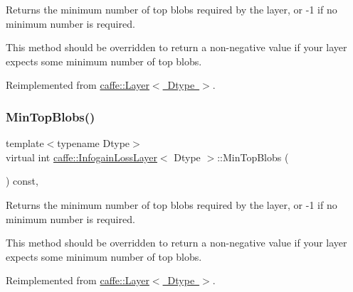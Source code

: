 Returns the minimum number of top blobs required by the layer, or -\/1 if no minimum number is required. 

This method should be overridden to return a non-\/negative value if your layer expects some minimum number of top blobs. 

Reimplemented from \mbox{\hyperlink{classcaffe_1_1_layer_ab9e4c8d642e413948b131d851a8462a4}{caffe\+::\+Layer$<$ Dtype $>$}}.

\mbox{\label{classcaffe_1_1_infogain_loss_layer_a15c4916e5de27151eb745491d8d14d41}} 
\subsubsection{\texorpdfstring{Min\+Top\+Blobs()}{MinTopBlobs()}\hspace{0.1cm}{\footnotesize\ttfamily [2/2]}}
{\footnotesize\ttfamily template$<$typename Dtype$>$ \\
virtual int \mbox{\hyperlink{classcaffe_1_1_infogain_loss_layer}{caffe\+::\+Infogain\+Loss\+Layer}}$<$ Dtype $>$\+::Min\+Top\+Blobs (\begin{DoxyParamCaption}{ }\end{DoxyParamCaption}) const\hspace{0.3cm}{\ttfamily [inline]}, {\ttfamily [virtual]}}



Returns the minimum number of top blobs required by the layer, or -\/1 if no minimum number is required. 

This method should be overridden to return a non-\/negative value if your layer expects some minimum number of top blobs. 

Reimplemented from \mbox{\hyperlink{classcaffe_1_1_layer_ab9e4c8d642e413948b131d851a8462a4}{caffe\+::\+Layer$<$ Dtype $>$}}.

\mbox{\label{classcaffe_1_1_infogain_loss_layer_aa2903026b3886816270deb038a463759}} 
